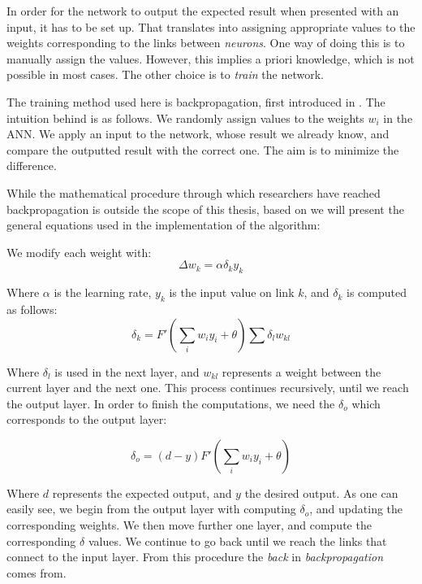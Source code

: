 In order for the network to output the expected result when presented with an input, it has to be set up. That translates into assigning appropriate values to the weights corresponding to the links between \textit{neurons}. One way of doing this is to manually assign the values. However, this implies a priori knowledge, which is not possible in most cases. The other choice is to \textit{train} the network. 

The training method used here is backpropagation, first introduced in \cite{rumelhart}. The intuition behind is as follows. We randomly assign values to the weights $w_i$ in the ANN. We apply an input to the network, whose result we already know, and compare the outputted result with the correct one. The aim is to minimize the difference. 

While the mathematical procedure through which researchers have reached backpropagation is outside the scope of this thesis, based on \cite{annintroduction} we will present the general equations used in the implementation of the algorithm:

We modify each weight with:  
\begin{equation*}
\Delta w_k = \alpha \delta_k y_k
\end{equation*}

Where $\alpha$ is the learning rate, $y_k$ is the input value on link $k$, and $\delta_k$ is computed as follows:
\begin{equation*}
\delta_k = F'( \sum_i w_i y_i + \theta ) \sum \delta_l w_{kl}
\end{equation*}

Where $\delta_l$ is used in the next layer, and $w_{kl}$ represents a weight between the current layer and the next one. This process continues recursively, until we reach the output layer. In order to finish the computations, we need the $\delta_o$ which corresponds to the output layer:  

\begin{equation*}
\delta_o = (d - y) F'(\sum_i w_i y_i + \theta)
\end{equation*}

Where $d$ represents the expected output, and $y$ the desired output. As one can easily see, we begin from the output layer with computing $\delta_o$, and updating the corresponding weights. We then move further one layer, and compute the corresponding $\delta$ values. We continue to go back until we reach the links that connect to the input layer. From this procedure the \textit{back} in \textit{backpropagation} comes from. 

